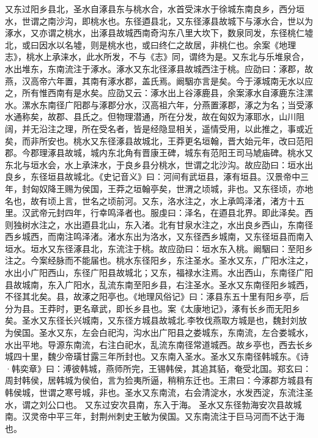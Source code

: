 \documentclass[12pt,UTF8]{ctexbook}
\begin{document}
又东过阳乡县北，圣水自涿县东与桃水合，水首受涞水于徐城东南良乡，西分垣水，世谓之南沙沟，即桃水也。东径逎县北，又东径涿县故城下与涿水合，世以为涿水，又亦谓之桃水，出涿县故城西南奇沟东八里大坎下，数泉同发，东径桃仁墟北，或曰因水以名墟，则是桃水也，或曰终仁之故居，非桃仁也。余案《地理志》，桃水上承涞水，此水所发，不与《志》同，谓终为是。又东北与乐堆泉合，水出堆东，东南流注于涿水。涿水又东北径涿县故城西注于桃。应劭曰：涿郡，故燕，汉高帝六年置，其南有涿水郡，盖氏焉。阚駰亦言是矣。今于涿城南无水以应之，所有惟西南有是水矣。应劭又云：涿水出上谷涿鹿县，余案涿水自涿鹿东注漯水。漯水东南径广阳郡与涿郡分水，汉高祖六年，分燕置涿郡，涿之为名；当受涿水通称矣，故郡、县氏之。但物理潜通，所在分发，故在匈奴为涿耶水，山川阻阔，并无沿注之理，所在受名者，皆是经隐显相关，遥情受用，以此推之，事或近矣，而非所安也。桃水又东径涿县故城北，王莽更名垣翰，晋大始元年，改曰范阳郡。今郡理涿县故城，城内东北角有晋康王碑，城东有范阳王司马虓庙碑。桃水又东北与垣水会，水上承涞水，于良乡县分桃水，世谓之北沙沟。故应劭曰：垣水出良乡，东径垣县故城北。《史记音义》曰：河间有武垣县，涿有垣县。汉景帝中三年，封匈奴降王赐为侯国，王莽之垣翰亭矣，世渭之顷城，非也。又东径顷，亦地名也，故有顷上言，世名之顷前河。又东，洛水注之，水上承鸣泽渚，渚方十五里。汉武帝元封四年，行幸鸣泽者也。服虔曰：泽名，在逎县北界。即此泽矣。西则独树水注之，水出逎县北山，东入渚。北有甘泉水注之，水出良乡西山，东南径西乡城西，而南注鸣泽渚。渚水东出为洛水，又东径西乡城南，又东径垣县而南入垣水。垣水又东径涿县北，东流注于桃。故应劭曰：垣水东入桃。阚駰曰：至阳乡注之。今案经脉而不能届也。桃水东径阳乡，东注圣水。圣水又东，广阳水注之，水出小广阳西山，东径广阳县故城北；又东，福禄水注焉。水出西山，东南径广阳县故城南，东入广阳水，乱流东南至阳乡县，右注圣水。圣水又东南径阳乡城西，不径其北矣。县，故涿之阳亭也。《地理风俗记》曰：涿县东五十里有阳乡亭，后分为县。王莽时，更名章武，即长乡县也。案《太康地记》，涿有长乡而无阳乡矣。圣水又东径长兴城南，又东径方城县故城北.李牧伐燕取方城是也，魏封刘放为侯国。圣水又东，左会白祀沟，沟水出广阳县之娄城东，东南流，左合娄城水，水出平地。导源东南流，右注白祀水，乱流东南径常道城西。故乡亭也，西去长乡城四十里，魏少帝璜甘露三年所封也。又东南入圣水。圣水又东南径韩城东。《诗·韩奕章》曰：溥彼韩城，燕师所完，王锡韩侯，其追其貊，奄受北国。郑玄曰：周封韩侯，居韩城为侯伯，言为猃夷所逼，稍稍东迁也。王肃曰：今涿郡方城县有韩侯城，世谓之寒号城，非也。圣水又东南流，右会清淀水，水发西淀，东流注圣水，谓之刘公口也。
又东过安次县南，东入于海。
圣水又东径勃海安次县故城南。汉灵帝中平三年，封荆州刺史王敏为侯国。又东南流注于巨马河而不达于海也。
\end{document}
